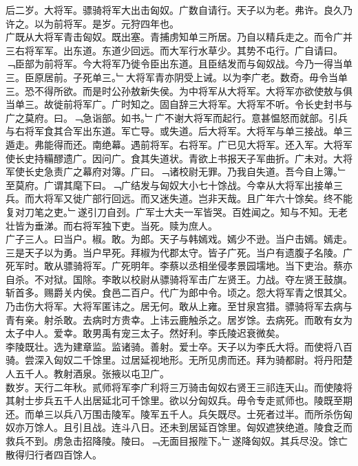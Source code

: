 \documentclass{zhvt-classic}
\begin{document}
\hspace*{2em}后二岁。大将军。骠骑将军大出击匈奴。广数自请行。天子以为老。弗许。良久乃许之。以为前将军。是岁。元狩四年也。\\
\hspace*{2em}广既从大将军青击匈奴。既出塞。青捕虏知单三所居。乃自以精兵走之。而令广并三右将军军。出东道。东道少回远。而大军行水草少。其势不屯行。广自请曰。﹁臣部为前将军。今大将军乃徙令臣出东道。且臣结发而与匈奴战。今乃一得当单三。臣原居前。子死单三。﹂大将军青亦阴受上诫。以为李广老。数奇。毋令当单三。恐不得所欲。而是时公孙敖新失侯。为中将军从大将军。大将军亦欲使敖与俱当单三。故徙前将军广。广时知之。固自辞三大将军。大将军不听。令长史封书与广之莫府。曰。﹁急诣部。如书。﹂广不谢大将军而起行。意甚愠怒而就部。引兵与右将军食其合军出东道。军亡导。或失道。后大将军。大将军与单三接战。单三遁走。弗能得而还。南绝幕。遇前将军。右将军。广已见大将军。还入军。大将军使长史持糒醪遗广。因问广。食其失道状。青欲上书报天子军曲折。广未对。大将军使长史急责广之幕府对簿。广曰。﹁诸校尉无罪。乃我自失道。吾今自上簿。﹂\\
\hspace*{2em}至莫府。广谓其麾下曰。﹁广结发与匈奴大小七十馀战。今幸从大将军出接单三兵。而大将军又徙广部行回远。而又迷失道。岂非天哉。且广年六十馀矣。终不能复对刀笔之吏。﹂遂引刀自刭。广军士大夫一军皆哭。百姓闻之。知与不知。无老壮皆为垂涕。而右将军独下吏。当死。赎为庶人。\\
\hspace*{2em}广子三人。曰当户。椒。敢。为郎。天子与韩嫣戏。嫣少不逊。当户击嫣。嫣走。三是天子以为勇。当户早死。拜椒为代郡太守。皆子广死。当户有遗腹子名陵。广死军时。敢从骠骑将军。广死明年。李蔡以丞相坐侵孝景园壖地。当下吏治。蔡亦自杀。不对狱。国除。李敢以校尉从骠骑将军击广左贤王。力战。夺左贤王鼓旗。斩首多。赐爵关内侯。食邑二百户。代广为郎中令。顷之。怨大将军青之恨其父。乃击伤大将军。大将军匿讳之。居无何。敢从上雍。至甘泉宫猎。骠骑将军去病与青有亲。射杀敢。去病时方贵幸。上讳云鹿触杀之。居岁馀。去病死。而敢有女为太子中人。爱幸。敢男禹有宠三太子。然好利。李氏陵迟衰微矣。\\
\hspace*{2em}李陵既壮。选为建章监。监诸骑。善射。爱士卒。天子以为李氏大将。而使将八百骑。尝深入匈奴二千馀里。过居延视地形。无所见虏而还。拜为骑都尉。将丹阳楚人五千人。教射酒泉。张掖以屯卫广。\\
\hspace*{2em}数岁。天行二年秋。贰师将军李广利将三万骑击匈奴右贤王三祁连天山。而使陵将其射士步兵五千人出居延北可千馀里。欲以分匈奴兵。毋令专走贰师也。陵既至期还。而单三以兵八万围击陵军。陵军五千人。兵矢既尽。士死者过半。而所杀伤匈奴亦万馀人。且引且战。连斗八日。还未到居延百馀里。匈奴遮狭绝道。陵食乏而救兵不到。虏急击招降陵。陵曰。﹁无面目报陛下。﹂遂降匈奴。其兵尽没。馀亡散得归行者四百馀人。\\
\end{document}
